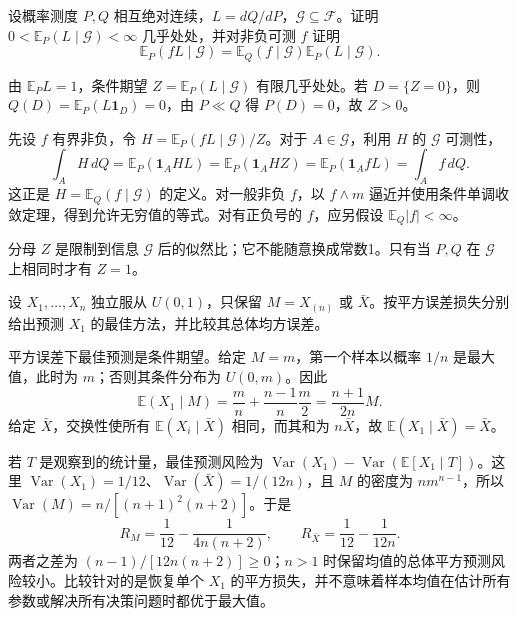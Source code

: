 \documentclass[UTF8,12pt,a4paper,fontset=fandol]{ctexbook}
\newcommand{\E}{\mathbb E}
\DeclareMathOperator{\Var}{Var}
\begin{document}
\begin{example}[原题3：改变测度后的条件期望]\label{yau:2014-3}
设概率测度 $P,Q$ 相互绝对连续，$L=dQ/dP$，$\mathcal G\subseteq\mathcal F$。证明 $0<\E_P(L\mid\mathcal G)<\infty$ 几乎处处，并对非负可测 $f$ 证明
\[
\E_P(fL\mid\mathcal G)=\E_Q(f\mid\mathcal G)\E_P(L\mid\mathcal G).
\]
\end{example}
\begin{solve}
由 $\E_PL=1$，条件期望 $Z=\E_P(L\mid\mathcal G)$ 有限几乎处处。若 $D=\{Z=0\}$，则 $Q(D)=\E_P(L\mathbf1_D)=0$，由 $P\ll Q$ 得 $P(D)=0$，故 $Z>0$。

先设 $f$ 有界非负，令 $H=\E_P(fL\mid\mathcal G)/Z$。对于 $A\in\mathcal G$，利用 $H$ 的 $\mathcal G$ 可测性，
\[
\int_AH\,dQ=\E_P(\mathbf1_AHL)=\E_P(\mathbf1_AHZ)=\E_P(\mathbf1_AfL)=\int_Af\,dQ.
\]
这正是 $H=\E_Q(f\mid\mathcal G)$ 的定义。对一般非负 $f$，以 $f\wedge m$ 逼近并使用条件单调收敛定理，得到允许无穷值的等式。对有正负号的 $f$，应另假设 $\E_Q|f|<\infty$。

分母 $Z$ 是限制到信息 $\mathcal G$ 后的似然比；它不能随意换成常数1。只有当 $P,Q$ 在 $\mathcal G$ 上相同时才有 $Z=1$。
\end{solve}

\begin{example}[原题4：用最大值或均值预测第一个样本]\label{yau:2014-4}
设 $X_1,\ldots,X_n$ 独立服从 $U(0,1)$，只保留 $M=X_{(n)}$ 或 $\bar X$。按平方误差损失分别给出预测 $X_1$ 的最佳方法，并比较其总体均方误差。
\end{example}
\begin{solve}
平方误差下最佳预测是条件期望。给定 $M=m$，第一个样本以概率 $1/n$ 是最大值，此时为 $m$；否则其条件分布为 $U(0,m)$。因此
\[
\E(X_1\mid M)=\frac mn+\frac{n-1}{n}\frac m2=\frac{n+1}{2n}M.
\]
给定 $\bar X$，交换性使所有 $\E(X_i\mid\bar X)$ 相同，而其和为 $n\bar X$，故 $\E(X_1\mid\bar X)=\bar X$。

若 $T$ 是观察到的统计量，最佳预测风险为 $\Var(X_1)-\Var(\E[X_1\mid T])$。这里 $\Var(X_1)=1/12$、$\Var(\bar X)=1/(12n)$，且 $M$ 的密度为 $nm^{n-1}$，所以 $\Var(M)=n/[(n+1)^2(n+2)]$。于是
\[
R_M=\frac1{12}-\frac1{4n(n+2)},\qquad R_{\bar X}=\frac1{12}-\frac1{12n}.
\]
两者之差为 $(n-1)/[12n(n+2)]\ge0$；$n>1$ 时保留均值的总体平方预测风险较小。比较针对的是恢复单个 $X_1$ 的平方损失，并不意味着样本均值在估计所有参数或解决所有决策问题时都优于最大值。
\end{solve}
\end{document}
